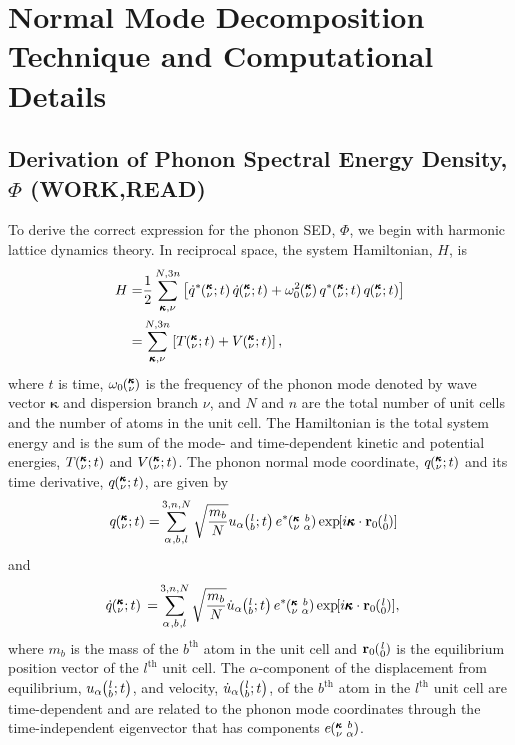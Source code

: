 \chapter{\label{Appendix_A}Normal Mode Decomposition Technique and 
Computational Details}

\section{\label{Appendix_A:Derivation}
Derivation of Phonon Spectral Energy Density, $\Phi$ (WORK,READ)}

To derive the correct expression for the phonon SED, $\Phi$, we begin 
with harmonic lattice dynamics theory.\cite{wallace_thermodynamics_1972,
dove_introduction_1993} In reciprocal space, the system Hamiltonian, 
$H$, is
\begin{equation}\label{E:H_HLD}
\begin{split}
H=&\frac{1}{2}\SUM{}{}\left[\dot{q}^*\kvt \dot{q}\kvt + \omega_0^2\kv 
q^*\kvt q\kvt\right]\\
 =&\SUM{}{}\left[T\kvt + V\kvt\right],
\end{split}
\end{equation}
where $t$ is time, $\omega_0\mspace{-4.0mu}\left(\mspace{-8.0mu} \begin{smallmatrix}&\pmb{\kappa} \\&\nu\end{smallmatrix} \mspace{-3.0mu}\right)$ is the frequency of the phonon mode 
denoted by
wave vector $\pmb{\kappa}$ and dispersion branch $\nu$, and $N$ and 
$n$ are
the total number of unit cells and the number of atoms in the unit cell.
The
Hamiltonian is the total system energy and is the sum of the mode- and
time-dependent kinetic and potential energies, $T\mspace{-4.0mu}\left(\mspace{-8.0mu} \begin{smallmatrix}&\pmb{\kappa} \\&\nu\end{smallmatrix} \mspace{-2.0mu};t\right)$ and $V\mspace{-4.0mu}\left(\mspace{-8.0mu} \begin{smallmatrix}&\pmb{\kappa} \\&\nu\end{smallmatrix} \mspace{-2.0mu};t\right)$.  The
phonon normal mode coordinate, $q\mspace{-4.0mu}\left(\mspace{-8.0mu} \begin{smallmatrix}&\pmb{\kappa} \\&\nu\end{smallmatrix} \mspace{-2.0mu};t\right)$ and its time derivative, 
$q\mspace{-4.0mu}\left(\mspace{-8.0mu} \begin{smallmatrix}&\pmb{\kappa} \\&\nu\end{smallmatrix} \mspace{-2.0mu};t\right)$, are given by
\begin{equation}\label{A:E:q_HLD}
\begin{split}
q\kvt=&\SUM{0}{}\sqrt{\frac{m_b}{N}}u_{\alpha}\lbt e^*\kvba
\EXP{i\pmb{\kappa}\cdot\mathbf{r}_0\ab{l}{0}}
\end{split}
\end{equation}
and
\begin{equation}\label{A:E:qdot_HLD}
\begin{split}
\dot{q}\kvt{}{}{}=&\SUM{0}{}\sqrt{\frac{m_b}{N}}\dot{u}_{\alpha}\lbt
e^*\kvba\EXP{i\pmb{\kappa}\cdot\mathbf{r}_0\ab{l}{0}},
\end{split}
\end{equation}
where $m_b$ is the mass of the $b^{\textrm{th}}$ atom in the unit cell and
$\mathbf{r}_0\ab{l}{0}$ is the equilibrium position vector of the
$l^{\textrm{th}}$ unit cell. The $\alpha$-component of the displacement from
equilibrium, $u_{\alpha}\mspace{-4.0mu}\left(\mspace{-8.0mu} \begin{smallmatrix}&l \\&b\end{smallmatrix}\mspace{-2.0mu};t\right)$, and velocity, $\dot{u}_{\alpha}\mspace{-4.0mu}\left(\mspace{-8.0mu} \begin{smallmatrix}&l \\&b\end{smallmatrix}\mspace{-2.0mu};t\right)$, of the
$b^{\textrm{th}}$ atom in the $l^{\textrm{th}}$ unit cell are time-dependent
and are related to the phonon mode coordinates through the time-independent
eigenvector that has components $e\mspace{-4.0mu}\left(\mspace{-8.0mu} \begin{smallmatrix} &\pmb{\kappa} &b \\ &\nu &\alpha\end{smallmatrix} \mspace{-3.0mu}\right)$. 

